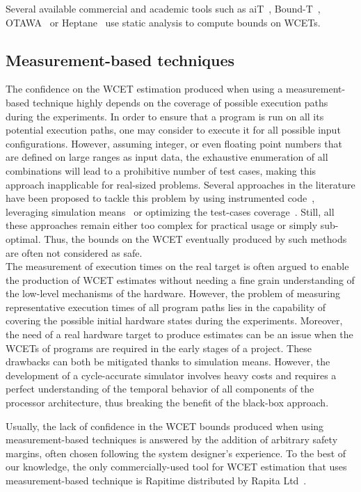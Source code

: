 \documentclass[main.tex]{subfiles}
\begin{document}
Several available commercial and academic tools such as aiT~\cite{aiT}, Bound-T~\cite{BoundT}, OTAWA~\cite{Otawa} or Heptane~\cite{Heptane} use static analysis to compute bounds on WCETs.



\subsection{Measurement-based techniques}
The confidence on the WCET estimation produced when using a measurement-based technique highly depends on the coverage of possible execution paths during the experiments. In order to ensure that a program is run on all its potential execution paths, one may consider to execute it for all possible input configurations. However, assuming integer, or even floating point numbers that are defined on large ranges as input data, the exhaustive enumeration of all combinations will lead to a prohibitive number of test cases, making this approach inapplicable for real-sized problems. Several approaches in the literature have been proposed to tackle this problem by using instrumented code~\cite{Williams2005}, leveraging simulation means~\cite{Lundqvist1999_rts} or optimizing the test-cases coverage~\cite{Law2016}. Still, all these approaches remain either too complex for practical usage or simply sub-optimal. Thus, the bounds on the WCET eventually produced by such methods are often not considered as safe. \\

The measurement of execution times on the real target is often argued to enable the production of WCET estimates without needing a fine grain understanding of the low-level mechanisms of the hardware. However, the problem of measuring representative execution times of all program paths lies in the capability of covering the possible initial hardware states during the experiments. Moreover, the need of a real hardware target to produce estimates can be an issue when the WCETs of programs are required in the early stages of a project. These drawbacks can both be mitigated thanks to simulation means. However, the development of a cycle-accurate simulator involves heavy costs and requires a perfect understanding of the temporal behavior of all components of the processor architecture, thus breaking the benefit of the black-box approach.

Usually, the lack of confidence in the WCET bounds produced when using measurement-based techniques is answered by the addition of arbitrary safety margins, often chosen following the system designer's experience. 
To the best of our knowledge, the only commercially-used tool for WCET estimation that uses measurement-based technique is Rapitime distributed by Rapita Ltd~\cite{Rapitime}.
\end{document}
